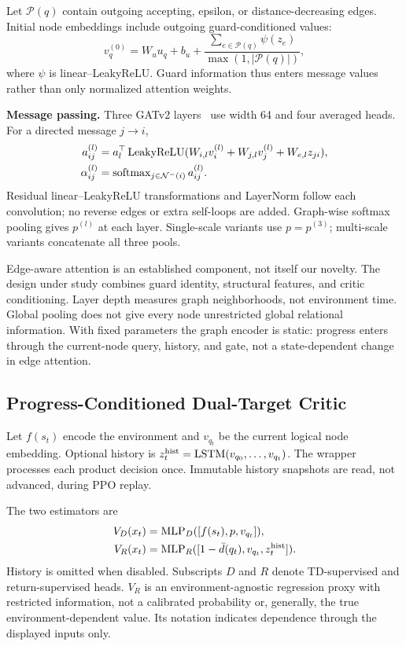 \documentclass[conference]{IEEEtran}
\newcommand{\softmax}{\operatorname{softmax}}
\begin{document}
Let $\mathcal P(q)$ contain outgoing accepting, epsilon, or distance-decreasing edges. Initial node embeddings include outgoing guard-conditioned values:
\begin{equation}
v_q^{(0)}=W_u u_q+b_u+
\frac{\sum_{e\in\mathcal P(q)}\psi(z_e)}{\max(1,|\mathcal P(q)|)},
\label{eq:outgoing}
\end{equation}
where $\psi$ is linear--LeakyReLU. Guard information thus enters message values rather than only normalized attention weights.


\textbf{Message passing.}
Three GATv2 layers~\citep{Brody2022} use width 64 and four averaged heads. For a directed message $j\rightarrow i$,
\begin{align}
a_{ij}^{(l)}&=a_l^\top\operatorname{LeakyReLU}
(W_{i,l}v_i^{(l)}+W_{j,l}v_j^{(l)}+W_{e,l}z_{ji}),\notag\\
\alpha_{ij}^{(l)}&=\softmax_{j\in\mathcal N^-(i)}a_{ij}^{(l)}.
\label{eq:attention}
\end{align}
Residual linear--LeakyReLU transformations and LayerNorm follow each convolution; no reverse edges or extra self-loops are added. Graph-wise softmax pooling gives $p^{(l)}$ at each layer. Single-scale variants use $p=p^{(3)}$; multi-scale variants concatenate all three pools.

Edge-aware attention is an established component, not itself our novelty. The design under study combines guard identity, structural features, and critic conditioning. Layer depth measures graph neighborhoods, not environment time. Global pooling does not give every node unrestricted global relational information. With fixed parameters the graph encoder is static: progress enters through the current-node query, history, and gate, not a state-dependent change in edge attention.

\subsection{Progress-Conditioned Dual-Target Critic}
\label{sec:critic}
Let $f(s_t)$ encode the environment and $v_{q_t}$ be the current logical node embedding. Optional history is $z_t^{\rm hist}=\operatorname{LSTM}(v_{q_0},\ldots,v_{q_t})$. The wrapper processes each product decision once. Immutable history snapshots are read, not advanced, during PPO replay.

The two estimators are
\begin{align}
V_D(x_t)&=\operatorname{MLP}_D([f(s_t),p,v_{q_t}]),\notag\\
V_R(x_t)&=\operatorname{MLP}_R([1-\bar d(q_t),v_{q_t},z_t^{\rm hist}]).
\label{eq:heads}
\end{align}
History is omitted when disabled. Subscripts $D$ and $R$ denote TD-supervised and return-supervised heads. $V_R$ is an environment-agnostic regression proxy with restricted information, not a calibrated probability or, generally, the true environment-dependent value. Its notation indicates dependence through the displayed inputs only.
\end{document}
